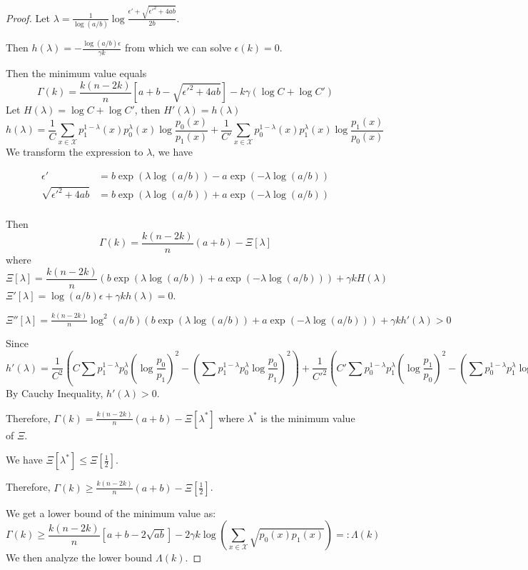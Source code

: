 \documentclass{article}
\begin{document}
\begin{proof}
	Let $\lambda = \frac{1}{\log(a/b)}\log\frac{\epsilon'+\sqrt{\epsilon'^2+4ab}}{2b}$.
	
	Then $h(\lambda) = -\frac{\log(a/b)\epsilon}{\gamma k}$ from which we can solve $\epsilon(k)=0$.
	
	Then the minimum value equals
	$$
	\Gamma(k) = \frac{k(n-2k)}{n}[a+b-\sqrt{\epsilon'^2 + 4ab}] - k\gamma(\log C + \log C')
	$$
	Let $H(\lambda) = \log C + \log C'$, then $H'(\lambda) = h(\lambda)$
	$$
	h(\lambda)=\frac{1}{C}\sum_{x\in\mathcal{X}} p^{1-\lambda}_1(x)p^{\lambda}_0(x)\log\frac{p_0(x)}{p_1(x)}+\frac{1}{C'}\sum_{x\in\mathcal{X}} p^{1-\lambda}_0(x)p^{\lambda}_1(x)\log\frac{p_1(x)}{p_0(x)}
	$$
	We transform the expression to $\lambda$, we have
	
	\begin{align}
	\epsilon' &= b \exp(\lambda \log(a/b)) - a\exp(-\lambda  \log(a/b)) \\
	\sqrt{\epsilon'^2 + 4ab}  &= b \exp(\lambda  \log(a/b)) + a\exp(-\lambda  \log(a/b)) \\
	\end{align}
	
	Then
	$$
	\Gamma(k) = \frac{k(n-2k)}{n}(a+b) - \Xi[\lambda]
	$$
	where
	$$
	\Xi[\lambda] = \frac{k(n-2k)}{n}(b \exp(\lambda  \log(a/b)) + a\exp(-\lambda \log(a/b))) + \gamma k H(\lambda)
	$$
	$\Xi'[\lambda] = \log(a/b) \epsilon + \gamma k h(\lambda) = 0$.
	
	$\Xi''[\lambda] = \frac{k(n-2k)}{n}\log^2(a/b)(b \exp( \lambda\log(a/b)) + a\exp(-\lambda \log(a/b))) + \gamma k h'(\lambda)>0$
	
	Since
	$$
	h'(\lambda)=\frac{1}{C^2}(C\sum p_1^{1-\lambda}p_0^{\lambda}(\log\frac{p_0}{p_1})^2-(\sum p_1^{1-\lambda}p_0^{\lambda}\log\frac{p_0}{p_1})^2) + \frac{1}{C'^2}(C'\sum p_0^{1-\lambda}p_1^{\lambda}(\log\frac{p_1}{p_0})^2-(\sum p_0^{1-\lambda}p_1^{\lambda}\log\frac{p_1}{p_0})^2)
	$$
	By Cauchy Inequality, $h'(\lambda) > 0$.
	
	Therefore, $\Gamma(k) = \frac{k(n-2k)}{n}(a+b) - \Xi[\lambda^*]$ where $\lambda^*$ is the minimum value of $\Xi$.
	
	We have $\Xi[\lambda^*] \leq \Xi[\frac{1}{2}]$.
	
	Therefore, $\Gamma(k) \geq  \frac{k(n-2k)}{n}(a+b) - \Xi[\frac{1}{2}]$.
	
	We get a lower bound of the minimum value as:
	$$
	\Gamma(k) \geq \frac{k(n-2k)}{n}[a+b-2\sqrt{ab}] - 2\gamma k\log(\sum_{x\in\mathcal{X}}\sqrt{p_0(x)p_1(x)}) =:\Lambda(k)
	$$
	We then analyze the lower bound $\Lambda(k)$.
\end{proof}
\end{document}
